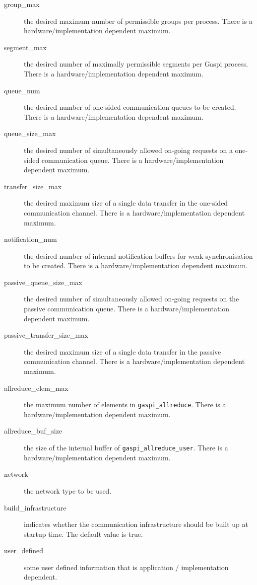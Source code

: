 \documentclass[a4paper]{article}
\newlength{\st}\setlength{\st}{0pt}
\newcommand{\zsep}[1]{#1}
\newcommand{\gaspiprefix}{gaspi}
\newcommand{\GASPI}{{\sc Gaspi}}
\newcommand{\function}[1]{{\tt #1}}
\newcommand{\gaspifunction}[1]{\function{\protect\zsep{\gaspiprefix\_#1}}}
\begin{document}
\begin{description}
\item[group\_max] the desired maximum number of permissible groups per process. There is a hardware/implementation dependent maximum.
\item[segment\_max] the desired number of maximally permissible segments per \GASPI{} process.
There is a hardware/implementation dependent maximum.
\item[queue\_num] the desired number of one-sided communication queues to be created. There is a hardware/implementation
dependent maximum.
\item[queue\_size\_max] the desired number of simultaneously allowed on-going requests on a one-sided communication queue.
There is a hardware/implementation dependent maximum.
\item[transfer\_size\_max] the desired maximum size of a single data
  transfer in the one-sided communication channel.
There is a hardware/implementation dependent maximum.
\item[notification\_num] the desired number of internal notification buffers for weak synchronisation to be created.
There is a hardware/implementation dependent maximum.
\item[passive\_queue\_size\_max] the desired number of simultaneously allowed on-going requests on the
passive communication queue. There is a hardware/implementation dependent maximum.
\item[passive\_transfer\_size\_max] the desired maximum size of a
  single data transfer in the passive communication channel.
There is a hardware/implementation dependent maximum.
\item[allreduce\_elem\_max] the maximum number of elements in \gaspifunction{allreduce}.
There is a hardware/implementation dependent maximum.
\item[allreduce\_buf\_size] the size of the internal buffer of \gaspifunction{allreduce\_user}.
There is a hardware/implementation dependent maximum.
\item[network] the network type to be used.
\item[build\_infrastructure] indicates whether the communication infrastructure should
be built up at startup time. The default value is true.
\item[user\_defined] some user defined information that is application / implementation dependent.
\end{description}
\end{document}
